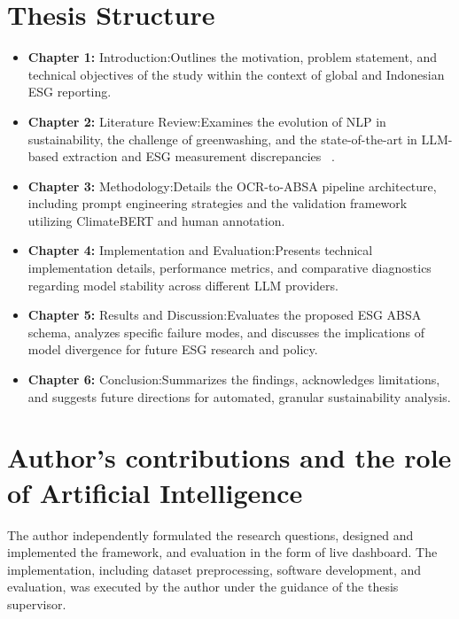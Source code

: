 \documentclass[english, online, cse, master]{dithesis}
\begin{document}
\section{Thesis Structure}
\begin{itemize}
\item 

\textbf{Chapter 1:} Introduction:Outlines the motivation, problem statement, and technical objectives of the study within the context of global and Indonesian ESG reporting.\item 

\textbf{Chapter 2:} Literature Review:Examines the evolution of NLP in sustainability, the challenge of greenwashing, and the state-of-the-art in LLM-based extraction and ESG measurement discrepancies  ~\cite{p__raghavendra_rau_a32af285}.\item 

\textbf{Chapter 3:} Methodology:Details the OCR-to-ABSA pipeline architecture, including prompt engineering strategies and the validation framework utilizing ClimateBERT and human annotation.\item 

\textbf{Chapter 4:} Implementation and Evaluation:Presents technical implementation details, performance metrics, and comparative diagnostics regarding model stability across different LLM providers.\item 

\textbf{Chapter 5:} Results and Discussion:Evaluates the proposed ESG ABSA schema, analyzes specific failure modes, and discusses the implications of model divergence for future ESG research and policy.\item 

\textbf{Chapter 6:} Conclusion:Summarizes the findings, acknowledges limitations, and suggests future directions for automated, granular sustainability analysis.
\end{itemize}

\section{Author's contributions and the role of Artificial Intelligence}

The author independently formulated the research questions, designed and implemented the framework, and evaluation in the form of live dashboard. The implementation, including dataset preprocessing, software development, and evaluation, was executed by the author under the guidance of the thesis supervisor. 
\end{document}
